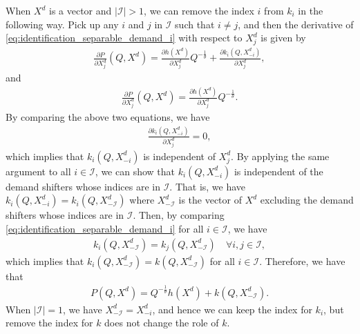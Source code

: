 \documentclass[11pt, a4paper]{article}
\theoremstyle{remark}
\begin{document}
When $X^{d}$ is a vector and $|\mathcal{I}| > 1$, we can remove the index $i$ from $k_i$ in the following way.
Pick up any $i$ and $j$ in $\mathcal{I}$ such that $i \ne j$, and then the derivative of \eqref{eq:identification_separable_demand_i} with respect to $X^{d}_j$ is given by
\begin{align}
    \frac{\partial P}{\partial X^{d}_j}(Q, X^{d}) = \frac{\partial h(X^{d})}{\partial X^{d}_j} Q^{-\frac{1}{\theta}} + \frac{\partial k_i(Q, X^{d}_{-i})}{\partial X^{d}_j},
\end{align}
and
\begin{align}
    \frac{\partial P}{\partial X^{d}_j}(Q, X^{d}) = \frac{\partial h(X^{d})}{\partial X^{d}_j} Q^{-\frac{1}{\theta}}.
\end{align}
By comparing the above two equations, we have
\begin{align}
    \frac{\partial k_i(Q, X^{d}_{-i})}{\partial X^{d}_j} = 0,
\end{align} 
which implies that $k_i(Q, X^{d}_{-i})$ is independent of $X^{d}_j$.
By applying the same argument to all $i \in \mathcal{I}$, we can show that $k_i(Q, X^{d}_{-i})$ is independent of the demand shifters whose indices are in $\mathcal{I}$.
That is, we have $k_i(Q, X^{d}_{-i}) = k_i(Q, X^{d}_{-\mathcal{I}})$ where $X^{d}_{-\mathcal{I}}$ is the vector of $X^{d}$ excluding the demand shifters whose indices are in $\mathcal{I}$.
Then, by comparing \eqref{eq:identification_separable_demand_i} for all $i \in \mathcal{I}$, we have
\begin{align}
    k_i(Q, X^{d}_{-\mathcal{I}}) = k_j(Q, X^{d}_{-\mathcal{I}}) \quad \forall i,j \in \mathcal{I},
\end{align}
which implies that $k_i(Q, X^{d}_{-\mathcal{I}}) = k(Q, X^{d}_{-\mathcal{I}})$ for all $i \in \mathcal{I}$.
Therefore, we have that
\begin{align}
    P(Q, X^{d}) = Q^{-\frac{1}{\theta}}h(X^{d}) + k(Q, X^{d}_{-\mathcal{I}}).
\end{align}
When $|\mathcal{I}| = 1$, we have $X^{d}_{-\mathcal{I}} = X^{d}_{-i}$, and hence we can keep the index for $k_i$, but remove the index for $k$ does not change the role of $k$.

\end{document}
